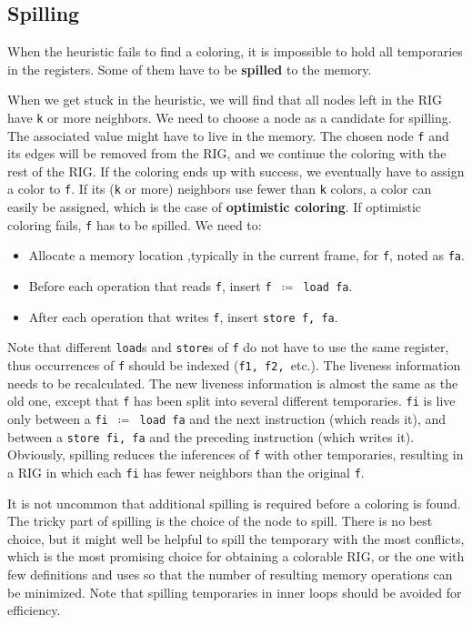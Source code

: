 \subsection{Spilling}
When the heuristic fails to find a coloring, it is impossible to hold all temporaries in the registers. Some of them have to be \textbf{spilled} to the memory. 

When we get stuck in the heuristic, we will find that all nodes left in the RIG have \texttt{k} or more neighbors. We need to choose a node as a candidate for spilling. The associated value might have to live in the memory. The chosen node \texttt{f} and its edges will be removed from the RIG, and we continue the coloring with the rest of the RIG. If the coloring ends up with success, we eventually have to assign a color to \texttt{f}. If its (\texttt{k} or more) neighbors use fewer than \texttt{k} colors, a color can easily be assigned, which is the case of \textbf{optimistic coloring}. If optimistic coloring fails, \texttt{f} has to be spilled. We need to:
\begin{itemize}
\item Allocate a memory location ,typically in the current frame, for \texttt{f}, noted as \texttt{fa}.
\item Before each operation that reads \texttt{f}, insert \texttt{f $\coloneqq$ load fa}.
\item After each operation that writes \texttt{f}, insert \texttt{store f, fa}.
\end{itemize} 
Note that different \texttt{load}s and \texttt{store}s of \texttt{f} do not have to use the same register, thus occurrences of \texttt{f} should be indexed (\texttt{f1, f2, }etc.). The liveness information needs to be recalculated. The new liveness information is almost the same as the old one, except that \texttt{f} has been split into several different temporaries. \texttt{fi} is live only between a \texttt{fi $\coloneqq$ load fa} and the next instruction (which reads it), and between a \texttt{store fi, fa} and the preceding instruction (which writes it). Obviously, spilling reduces the inferences of \texttt{f} with other temporaries, resulting in a RIG in which each \texttt{fi} has fewer neighbors than the original \texttt{f}.

It is not uncommon that additional spilling is required before a coloring is found. The tricky part of spilling is the choice of the node to spill. There is no best choice, but it might well be helpful to spill the temporary with the most conflicts, which is the most promising choice for obtaining a colorable RIG, or the one with few definitions and uses so that the number of resulting memory operations can be minimized. Note that spilling temporaries in inner loops should be avoided for efficiency. 

